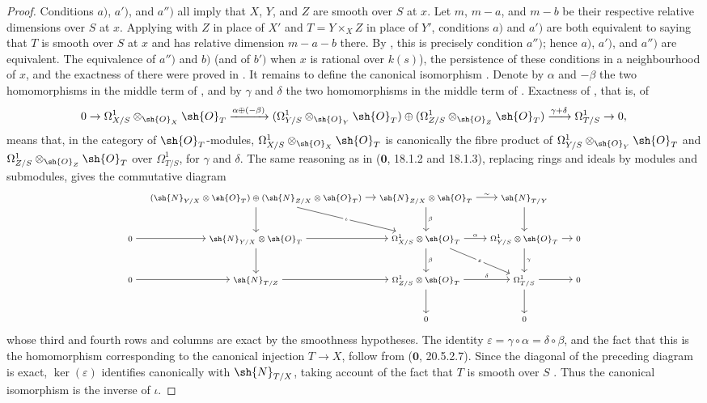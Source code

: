 \begin{proof}
Conditions $a)$, $a')$, and $a'')$ all imply that $X$, $Y$, and $Z$ are smooth over $S$ at $x$.
Let $m$, $m-a$, and $m-b$ be their respective relative dimensions over $S$ at $x$.
Applying  with $Z$ in place of $X'$ and $T=Y\times_XZ$ in place of $Y'$, conditions $a)$ and $a')$ are both equivalent to saying that $T$ is smooth over $S$ at $x$ and has relative dimension $m-a-b$ there.
By , this is precisely condition $a'')$; hence $a)$, $a')$, and $a'')$ are equivalent.
The equivalence of $a'')$ and $b)$ (and of $b')$ when $x$ is rational over $k(s)$), the persistence of these conditions in a neighbourhood of $x$, and the exactness of  there were proved in .
It remains to define the canonical isomorphism .
Denote by $\alpha$ and $-\beta$ the two homomorphisms in the middle term of , and by $\gamma$ and $\delta$ the two homomorphisms in the middle term of .
Exactness of , that is, of
\[
0\to\Omega^1_{X/S}\otimes_{\sh{O}_X}\sh{O}_T
\xrightarrow{\alpha\oplus(-\beta)}
(\Omega^1_{Y/S}\otimes_{\sh{O}_Y}\sh{O}_T)\oplus
(\Omega^1_{Z/S}\otimes_{\sh{O}_Z}\sh{O}_T)
\xrightarrow{\gamma+\delta}\Omega^1_{T/S}\to0,
\]
means that, in the category of $\sh{O}_T$-modules,
$\Omega^1_{X/S}\otimes_{\sh{O}_X}\sh{O}_T$ is canonically the fibre product of
$\Omega^1_{Y/S}\otimes_{\sh{O}_Y}\sh{O}_T$ and
$\Omega^1_{Z/S}\otimes_{\sh{O}_Z}\sh{O}_T$ over $\Omega^1_{T/S}$, for $\gamma$ and $\delta$.
The same reasoning as in ($\mathbf{0}$, 18.1.2 and 18.1.3), replacing rings and ideals by modules and submodules, gives the commutative diagram
\[
\scriptsize
\begin{tikzcd}[column sep=small,row sep=large]
 & (\sh{N}_{Y/X}\otimes\sh{O}_T)\oplus(\sh{N}_{Z/X}\otimes\sh{O}_T)
   \ar[r] \ar[d] \ar[dr,"\iota" description]
 & \sh{N}_{Z/X}\otimes\sh{O}_T \ar[r,"\sim"] \ar[d,"\beta"]
 & \sh{N}_{T/Y} \ar[d] \\
0 \ar[r] & \sh{N}_{Y/X}\otimes\sh{O}_T \ar[r] \ar[d]
 & \Omega^1_{X/S}\otimes\sh{O}_T \ar[r,"\alpha"] \ar[d,"\beta"] \ar[dr,"\varepsilon" description]
 & \Omega^1_{Y/S}\otimes\sh{O}_T \ar[r] \ar[d,"\gamma"] & 0 \\
0 \ar[r] & \sh{N}_{T/Z} \ar[r]
 & \Omega^1_{Z/S}\otimes\sh{O}_T \ar[r,"\delta"] \ar[d]
 & \Omega^1_{T/S} \ar[r] \ar[d] & 0 \\
 & & 0 & 0
\end{tikzcd}
\]
whose third and fourth rows and columns are exact by the smoothness hypotheses.
The identity $\varepsilon=\gamma\circ\alpha=\delta\circ\beta$, and the fact that this is the homomorphism corresponding to the canonical injection $T\to X$, follow from ($\mathbf{0}$, 20.5.2.7).
Since the diagonal of the preceding diagram is exact, $\ker(\varepsilon)$ identifies canonically with $\sh{N}_{T/X}$, taking account of the fact that $T$ is smooth over $S$ .
Thus the canonical isomorphism  is the inverse of $\iota$.
\end{proof}

